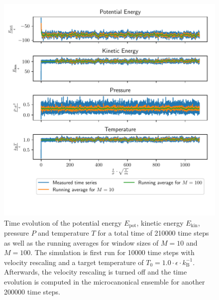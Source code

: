 \documentclass[a4paper,10pt,bibtotoc]{scrartcl}
\begin{document}
\begin{figure}
        \centering
        \includegraphics[width=\linewidth]{Figure_5.pdf}
    \caption{Time evolution of the potential energy $E_\mathrm{pot}$, kinetic energy $E_\mathrm{kin}$, pressure $P$ and temperature $T$ for a total time of 210000 time steps as well as the running averages for window sizes of $M=10$ and $M=100$. The simulation is first run for 10000 time steps with velocity rescaling and a target temperature of $T_0 = 1.0\cdot \epsilon\cdot k_\mathrm{B}^{-1}$. Afterwards, the velocity rescaling is turned off and the time evolution is computed in the microcanonical ensemble for another 200000 time steps.}
    \label{fig:fig5}
\end{figure}
\end{document}

